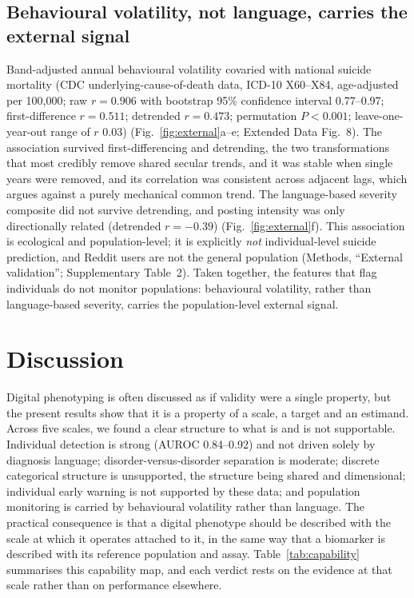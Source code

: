 \documentclass[11pt]{article}
\newcommand{\suptab}[1]{Supplementary Table~#1}
\newcommand{\edfig}[1]{Extended Data Fig.~#1}
\begin{document}
\subsection*{Behavioural volatility, not language, carries the external signal}
Band-adjusted annual behavioural volatility covaried with national suicide mortality (CDC
underlying-cause-of-death data, ICD-10 X60--X84, age-adjusted per 100{,}000; raw
$r=0.906$ with bootstrap 95\% confidence interval 0.77--0.97; first-difference $r=0.511$;
detrended $r=0.473$; permutation $P<0.001$; leave-one-year-out range of $r$ 0.03)
(Fig.~\ref{fig:external}a--e; \edfig{8}). The association survived first-differencing and
detrending, the two transformations that most credibly remove shared secular trends, and it was
stable when single years were removed, and its correlation was consistent across adjacent
lags, which argues against a purely mechanical common trend.
The language-based severity composite did not survive detrending, and posting intensity was
only directionally related (detrended $r=-0.39$) (Fig.~\ref{fig:external}f). This association
is ecological and population-level; it is explicitly \emph{not} individual-level suicide
prediction, and Reddit users are not the general population (Methods, ``External validation''; \suptab{2}). Taken
together, the features that flag individuals do not monitor populations: behavioural
volatility, rather than language-based severity, carries the population-level external signal.

\section*{Discussion}
Digital phenotyping is often discussed as if validity were a single property, but the present
results show that it is a property of a scale, a target and an estimand. Across five scales,
we found a clear structure to what is and is not supportable. Individual detection is strong
(AUROC 0.84--0.92) and not driven solely by diagnosis language; disorder-versus-disorder
separation is moderate; discrete categorical structure is unsupported, the structure being
shared and dimensional; individual early warning is not supported by these data; and population
monitoring is carried by behavioural volatility rather than language. The practical consequence
is that a digital phenotype should be described with the scale at which it operates attached to
it, in the same way that a biomarker is described with its reference population and assay. Table~\ref{tab:capability} summarises this capability map, and each verdict rests on the evidence at that scale rather than on performance elsewhere.
\end{document}
